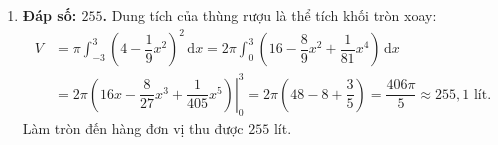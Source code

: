 \documentclass[12pt,a4paper]{article}
\begin{document}
\begin{enumerate}[start=21]
\item \textbf{Đáp số: $255$.}  
Dung tích của thùng rượu là thể tích khối tròn xoay:
\begin{align*}
V &= \pi\int_{-3}^3 \left(4 - \dfrac{1}{9}x^2\right)^2\,\mathrm{d}x = 2\pi\int_0^3 \left(16 - \dfrac{8}{9}x^2 + \dfrac{1}{81}x^4\right)\,\mathrm{d}x \\
&= 2\pi\left.\left(16x - \dfrac{8}{27}x^3 + \dfrac{1}{405}x^5\right)\right|_0^3 = 2\pi\left(48 - 8 + \dfrac{3}{5}\right) = \dfrac{406\pi}{5} \approx 255{,}1\text{ lít}.
\end{align*}
Làm tròn đến hàng đơn vị thu được $255$ lít.
\end{enumerate}
\end{document}
